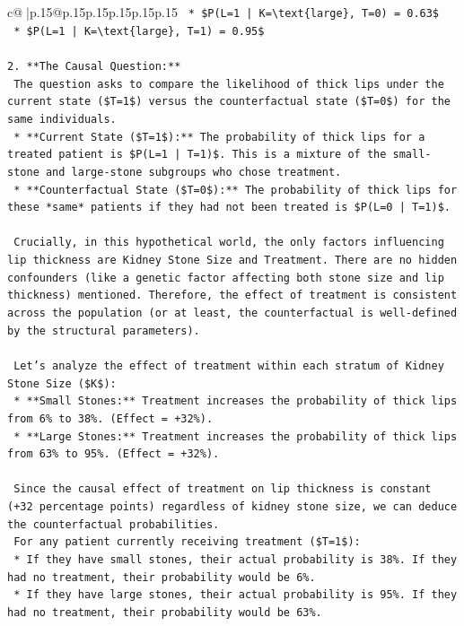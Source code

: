 \documentclass{article}
\begin{document}
{\begin{supertabular}{c@{$\;$}|p{.15\linewidth}@{}p{.15\linewidth}p{.15\linewidth}p{.15\linewidth}p{.15\linewidth}p{.15\linewidth}}
{{{\texttt{    *   \$P(L=1 | K=\textbackslash{}text\{large\}, T=0) = 0.63\$} \\
\texttt{    *   \$P(L=1 | K=\textbackslash{}text\{large\}, T=1) = 0.95\$} \\
\\ 
\texttt{2.  **The Causal Question:**} \\
\texttt{    The question asks to compare the likelihood of thick lips under the current state (\$T=1\$) versus the counterfactual state (\$T=0\$) for the same individuals.} \\
\texttt{    *   **Current State (\$T=1\$):** The probability of thick lips for a treated patient is \$P(L=1 | T=1)\$. This is a mixture of the small{-}stone and large{-}stone subgroups who chose treatment.} \\
\texttt{    *   **Counterfactual State (\$T=0\$):** The probability of thick lips for these *same* patients if they had not been treated is \$P(L=0 | T=1)\$.} \\
\\ 
\texttt{    Crucially, in this hypothetical world, the only factors influencing lip thickness are Kidney Stone Size and Treatment. There are no hidden confounders (like a genetic factor affecting both stone size and lip thickness) mentioned. Therefore, the effect of treatment is consistent across the population (or at least, the counterfactual is well{-}defined by the structural parameters).} \\
\\ 
\texttt{    Let's analyze the effect of treatment within each stratum of Kidney Stone Size (\$K\$):} \\
\texttt{    *   **Small Stones:** Treatment increases the probability of thick lips from 6\% to 38\%. (Effect = +32\%).} \\
\texttt{    *   **Large Stones:** Treatment increases the probability of thick lips from 63\% to 95\%. (Effect = +32\%).} \\
\\ 
\texttt{    Since the causal effect of treatment on lip thickness is constant (+32 percentage points) regardless of kidney stone size, we can deduce the counterfactual probabilities.} \\
\texttt{    For any patient currently receiving treatment (\$T=1\$):} \\
\texttt{    *   If they have small stones, their actual probability is 38\%. If they had no treatment, their probability would be 6\%.} \\
\texttt{    *   If they have large stones, their actual probability is 95\%. If they had no treatment, their probability would be 63\%.} \\
}}}
\end{supertabular}}
\end{document}
